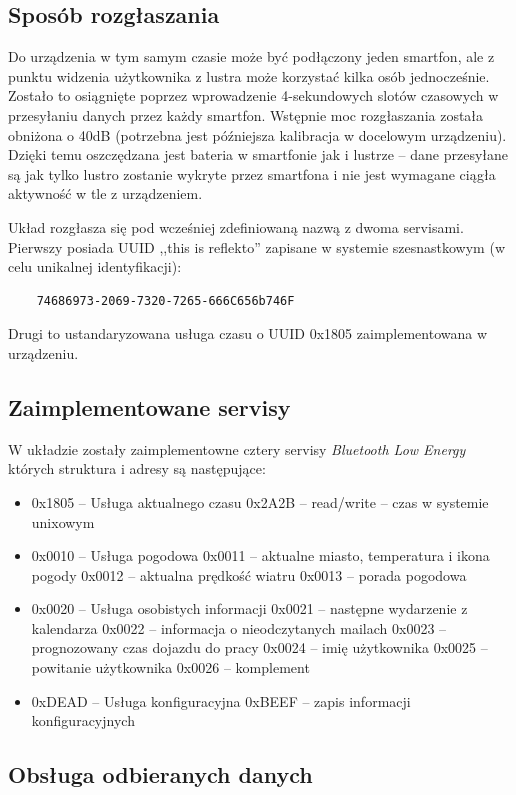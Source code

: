 \documentclass[a4paper,11pt]{article}
\begin{document}
\subsection{Sposób rozgłaszania}
Do urządzenia w tym samym czasie może być podłączony jeden smartfon, ale z punktu widzenia użytkownika z lustra może korzystać kilka osób jednocześnie. Zostało to osiągnięte poprzez wprowadzenie 4-sekundowych slotów czasowych w przesyłaniu danych przez każdy smartfon. Wstępnie moc rozgłaszania została obniżona o 40dB (potrzebna jest późniejsza kalibracja w docelowym urządzeniu). Dzięki temu oszczędzana jest bateria w smartfonie jak i lustrze -- dane przesyłane są jak tylko lustro zostanie wykryte przez smartfona i nie jest wymagane ciągła aktywność w tle z urządzeniem.

Układ rozgłasza się pod wcześniej zdefiniowaną nazwą z dwoma servisami. Pierwszy posiada UUID ,,this is reflekto'' zapisane w systemie szesnastkowym (w celu unikalnej identyfikacji):
\begin{lstlisting}
	74686973-2069-7320-7265-666C656b746F
\end{lstlisting}
Drugi to ustandaryzowana usługa czasu o UUID  0x1805 zaimplementowana w urządzeniu.

\subsection{Zaimplementowane servisy}
W układzie zostały zaimplementowne cztery servisy \textit{Bluetooth Low Energy} których struktura i adresy są następujące:
\begin{itemize}
	\item 0x1805 -- Usługa aktualnego czasu
	\subitem 0x2A2B -- read/write -- czas w systemie unixowym
	\item 0x0010 -- Usługa pogodowa
	\subitem 0x0011 -- aktualne miasto, temperatura i ikona pogody
	\subitem 0x0012 -- aktualna prędkość wiatru
	\subitem 0x0013 -- porada pogodowa
	\item 0x0020 -- Usługa osobistych informacji
	\subitem 0x0021 -- następne wydarzenie z kalendarza
	\subitem 0x0022 -- informacja o nieodczytanych mailach
	\subitem 0x0023 -- prognozowany czas dojazdu do pracy
	\subitem 0x0024 -- imię użytkownika
	\subitem 0x0025 -- powitanie użytkownika
	\subitem 0x0026 -- komplement
	\item  0xDEAD -- Usługa konfiguracyjna
	\subitem 0xBEEF -- zapis informacji konfiguracyjnych
\end{itemize}
\subsection{Obsługa odbieranych danych}
\end{document}
